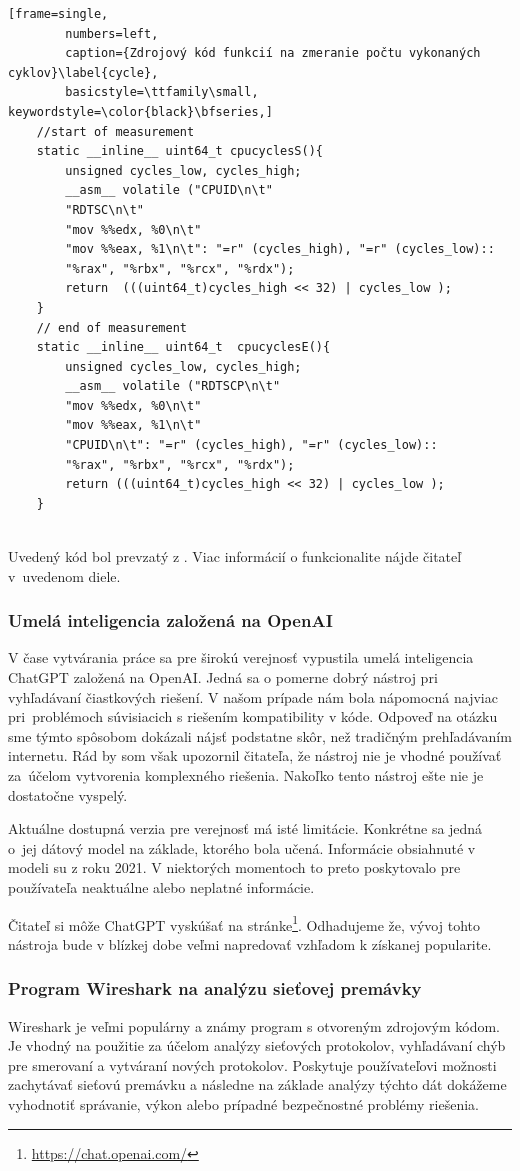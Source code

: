  \begin{minipage}{\linewidth} 	
	\begin{lstlisting}[frame=single,
		numbers=left,
		caption={Zdrojový kód funkcií na zmeranie počtu vykonaných cyklov}\label{cycle},
		basicstyle=\ttfamily\small, keywordstyle=\color{black}\bfseries,]
	//start of measurement
	static __inline__ uint64_t cpucyclesS(){
		unsigned cycles_low, cycles_high;
		__asm__ volatile ("CPUID\n\t"
		"RDTSC\n\t"
		"mov %%edx, %0\n\t"
		"mov %%eax, %1\n\t": "=r" (cycles_high), "=r" (cycles_low)::
		"%rax", "%rbx", "%rcx", "%rdx");
		return  (((uint64_t)cycles_high << 32) | cycles_low );
	}
	// end of measurement
	static __inline__ uint64_t  cpucyclesE(){
		unsigned cycles_low, cycles_high;
		__asm__ volatile ("RDTSCP\n\t"
		"mov %%edx, %0\n\t"
		"mov %%eax, %1\n\t"
		"CPUID\n\t": "=r" (cycles_high), "=r" (cycles_low)::
		"%rax", "%rbx", "%rcx", "%rdx");
		return (((uint64_t)cycles_high << 32) | cycles_low );
	}
	\end{lstlisting}
\end{minipage}\\ 
Uvedený kód bol prevzatý z \cite{bc}. Viac informácií o funkcionalite nájde čitateľ v~uvedenom diele. 

\subsubsection{Umelá inteligencia založená na OpenAI \cite{gpt}} 
V čase vytvárania práce sa pre širokú verejnosť vypustila umelá inteligencia ChatGPT založená na OpenAI. Jedná sa o pomerne dobrý nástroj pri vyhľadávaní čiastkových riešení. V našom prípade nám bola nápomocná najviac pri~problémoch súvisiacich s riešením kompatibility v kóde. Odpoveď na otázku sme týmto spôsobom dokázali nájsť podstatne skôr, než tradičným prehľadávaním internetu. Rád by som však upozornil čitateľa, že nástroj nie je vhodné používať za~účelom vytvorenia komplexného riešenia. Nakoľko tento nástroj ešte nie je dostatočne vyspelý. 
  
Aktuálne dostupná verzia pre verejnosť má isté limitácie. Konkrétne sa jedná o~jej dátový model na základe, ktorého bola učená. Informácie obsiahnuté v modeli su z roku 2021. V niektorých momentoch to preto poskytovalo pre používateľa neaktuálne alebo neplatné informácie.
 
Čitateľ si môže ChatGPT vyskúšať na stránke\footnote{\url{https://chat.openai.com/}}. Odhadujeme že, vývoj tohto nástroja bude v blízkej dobe veľmi napredovať vzhľadom k získanej popularite. 
\subsubsection{Program Wireshark na analýzu sieťovej premávky \cite{wireshark}} 
Wireshark je veľmi populárny a známy program s otvoreným zdrojovým kódom. Je vhodný na použitie za účelom analýzy sieťových protokolov, vyhľadávaní chýb pre smerovaní a vytváraní nových protokolov. Poskytuje používateľovi možnosti zachytávať sieťovú premávku a následne na základe analýzy týchto dát dokážeme vyhodnotiť správanie, výkon alebo prípadné bezpečnostné problémy riešenia.

